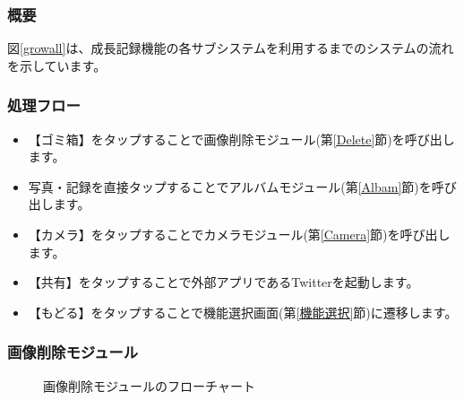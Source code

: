\documentclass[a4j]{jarticle}
\begin{document}
\subsubsection*{概要}
図\ref{growall}は、成長記録機能の各サブシステムを利用するまでのシステムの流れを示しています。

\subsubsection*{処理フロー}
\begin{itemize}
\item 【ゴミ箱】をタップすることで画像削除モジュール(第\ref{Delete}節)を呼び出します。

\item 写真・記録を直接タップすることでアルバムモジュール(第\ref{Albam}節)を呼び出します。

\item 【カメラ】をタップすることでカメラモジュール(第\ref{Camera}節)を呼び出します。

\item 【共有】をタップすることで外部アプリであるTwitterを起動します。

\item 【もどる】をタップすることで機能選択画面(第\ref{機能選択}節)に遷移します。
\end{itemize}

\subsubsection{画像削除モジュール\label{Delete}}
\begin{figure}[H]
    \begin{center}
    \caption {画像削除モジュールのフローチャート}
    \label{delete}
    \end{center}
\end{figure}
\end{document}
